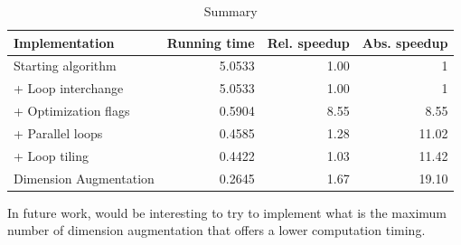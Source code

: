 \documentclass[conference]{IEEEtran}
\begin{document}
\renewcommand{\tablename}{Table}

\begin{table}[h!]
\begin{tabular}{||l r r r||} 
\hline
 Implementation & Running time & Rel. speedup & Abs. speedup \\ [0.5ex] 
 \hline\hline
 Starting algorithm & 5.0533 & 1.00 & 1 \\
 + Loop interchange & 5.0533 & 1.00 & 1 \\
 + Optimization flags & 0.5904 & 8.55 & 8.55 \\
 + Parallel loops & 0.4585 & 1.28 & 11.02 \\
 + Loop tiling & 0.4422 & 1.03 & 11.42 \\
 Dimension Augmentation & 0.2645 & 1.67 & 19.10 \\ [1ex] 
\hline
\end{tabular}
\caption{Summary}
\label{table:optimization-summary}
\end{table}

In future work, would be interesting to try to implement what is the maximum number of dimension augmentation that offers a lower computation timing.
\end{document}
